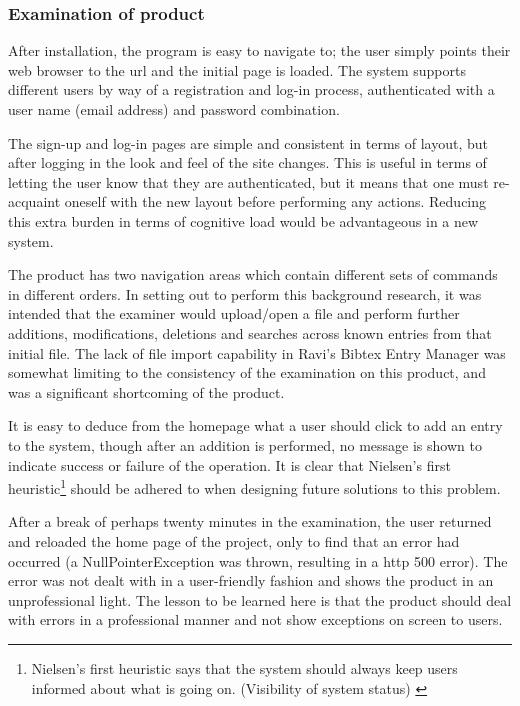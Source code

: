 \documentclass{l4proj}
\begin{document}
\subsubsection{Examination of product}
After installation, the program is easy to navigate to; the user simply points their web browser to the \gls{url} and the initial page is loaded. The system supports different users by way of a registration and log-in process, authenticated with a user name (email address) and password combination.

The sign-up and log-in pages are simple and consistent in terms of layout, but after logging in the look and feel of the site changes.  This is useful in terms of letting the user know that they are authenticated, but it means that one must re-acquaint oneself with the new layout before performing any actions.  Reducing this extra burden in terms of cognitive load would be advantageous in a new system.

The product has two navigation areas which contain different sets of commands in different orders. 
In setting out to perform this background research, it was intended that the examiner would upload/open a file and perform further additions, modifications, deletions and searches across known entries from that initial file.  The lack of file import capability in Ravi's Bibtex Entry Manager was somewhat limiting to the consistency of the examination on this product, and was a significant shortcoming of the product. 

It is easy to deduce from the homepage what a user should click to add an entry to the system, though after an addition is performed, no message is shown to indicate success or failure of the operation.  It is clear that Nielsen's first heuristic\footnote{\label{nielsenH1} Nielsen's first heuristic says that the system should always keep users informed about what is going on. (Visibility of system status) \cite{NielsenHeuristics}} should be adhered to when designing future solutions to this problem.%

After a break of perhaps twenty minutes in the examination, the user returned and reloaded the home page of the project, only to find that an error had occurred (a NullPointerException was thrown, resulting in a \gls{http} 500 error).  The error was not dealt with in a user-friendly fashion and shows the product in an unprofessional light.  The lesson to be learned here is that the product should deal with errors in a professional manner and not show exceptions on screen to users.
\end{document}
